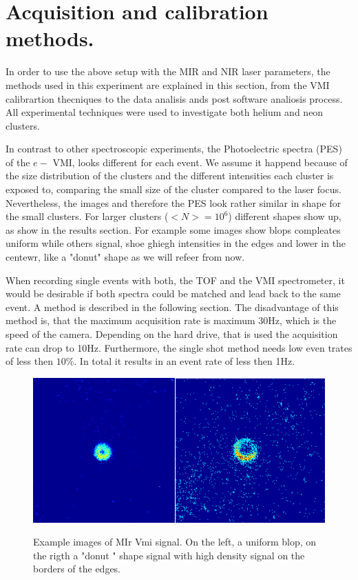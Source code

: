 \chapter{Acquisition and calibration methods.}


In order to use the above setup with the  MIR and NIR laser parameters, the methods used in this experiment are explained in this section, from the VMI calibrartion thecniques to the data analisis ands post software analiosis process. All experimental techniques were used to investigate both helium and neon clusters. 


In contrast to other spectroscopic experiments, the  Photoelectric spectra (PES) of the $e-$ VMI, looks different for each event. We assume it happend because of the size distribution of the clusters and the different intensities each cluster is exposed to, comparing the small size of the cluster compared to the laser focus. Nevertheless, the images and therefore the PES look rather similar in shape for the small clusters. For larger clusters ($<N>= 10^{6}$) different shapes show up, as show in the results section. For example some images show blops compleates uniform while others signal, shoe ghiegh intensities in the edges and lower in the centewr, like a "donut" shape as we will refeer from now.

When recording single events with both, the TOF and the VMI spectrometer, it would be desirable if both spectra could be matched and lead back to the same event. A method is described in the following section.
The disadvantage of this method is, that the maximum acquisition rate is maximum 30Hz, which is the speed of the camera. Depending on the hard drive, that is used the acquisition rate can drop to 10Hz. Furthermore, the single shot method needs low even trates of less then $10\%$. In total it results in an event rate of less then 1Hz.

\begin{figure}[hbtp]
\caption{Example images of MIr Vmi signal. On the left, a uniform blop, on the rigth a "donut " shape signal with high density signal on the borders of the edges. }
\centering
\includegraphics[scale=1]{../Images/vmi_examples.png}
\label{fig:vmiexample}
\end{figure}



